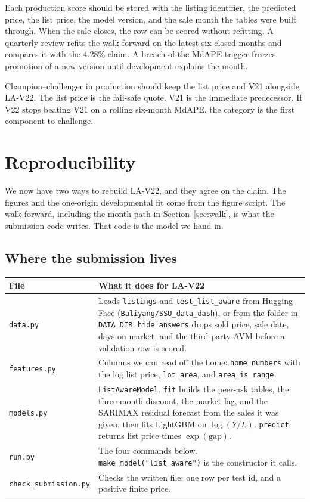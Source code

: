 \documentclass[11pt]{article}
\newcommand{\modelid}{LA-V22}
\begin{document}
Each production score should be stored with the listing identifier, the predicted price, the list price, the model version, and the sale month the tables were built through. When the sale closes, the row can be scored without refitting. A quarterly review refits the walk-forward on the latest six closed months and compares it with the \(4.28\%\) claim. A breach of the MdAPE trigger freezes promotion of a new version until development explains the month.

Champion--challenger in production should keep the list price and V21 alongside \modelid{}. The list price is the fail-safe quote. V21 is the immediate predecessor. If V22 stops beating V21 on a rolling six-month MdAPE, the category is the first component to challenge.

\section{Reproducibility}
\label{sec:repro}

We now have two ways to rebuild \modelid{}, and they agree on the claim. The figures and the one-origin developmental fit come from the figure script. The walk-forward, including the month path in Section~\ref{sec:walk}, is what the submission code writes. That code is the model we hand in.

\subsection{Where the submission lives}

\begin{center}
\small
\begin{tabular}{p{3.5cm}p{11.2cm}}
\toprule
File & What it does for \modelid{} \\
\midrule
\texttt{data.py} & Loads \texttt{listings} and \texttt{test\_list\_aware} from Hugging Face (\texttt{Baliyang/SSU\_data\_dash}), or from the folder in \texttt{DATA\_DIR}. \texttt{hide\_answers} drops sold price, sale date, days on market, and the third-party AVM before a validation row is scored. \\
\texttt{features.py} & Columns we can read off the home: \texttt{home\_numbers} with the log list price, \texttt{lot\_area}, and \texttt{area\_is\_range}. \\
\texttt{models.py} & \texttt{ListAwareModel}. \texttt{fit} builds the peer-ask tables, the three-month discount, the market lag, and the SARIMAX residual forecast from the sales it was given, then fits LightGBM on \(\log(Y/L)\). \texttt{predict} returns list price times \(\exp(\mathrm{gap})\). \\
\texttt{run.py} & The four commands below. \texttt{make\_model("list\_aware")} is the constructor it calls. \\
\texttt{check\_submission.py} & Checks the written file: one row per test id, and a positive finite price. \\
\bottomrule
\end{tabular}
\end{center}
\end{document}
